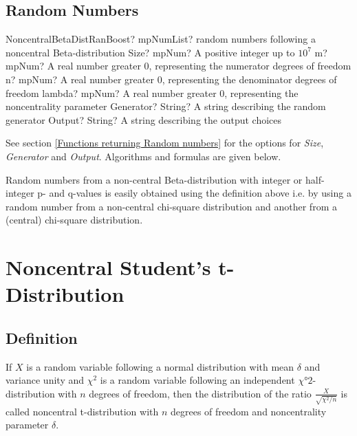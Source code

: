 \subsection{Random Numbers}

\begin{mpFunctionsExtract}
	\mpFunctionSixNotImplemented
	{NoncentralBetaDistRanBoost? mpNumList? random numbers following a noncentral Beta-distribution}
	{Size? mpNum? A positive integer up to $10^7$}
	{m? mpNum? A real number greater 0, representing the numerator  degrees of freedom}
	{n? mpNum? A real number greater 0, representing the denominator degrees of freedom}
	{lambda? mpNum? A real number greater 0, representing the noncentrality parameter}
	{Generator? String? A string describing the random generator}
	{Output? String? A string describing the output choices}
\end{mpFunctionsExtract}

\vspace{0.3cm}
See section \ref{Functions returning Random numbers} for the options for  {\itshape\sffamily Size},  {\itshape\sffamily Generator} and {\itshape\sffamily Output}. Algorithms and formulas are given below.

\vspace{0.3cm}
Random numbers from a non-central Beta-distribution with integer or half-integer p- and q-values is easily obtained using the definition above i.e. by using a random number from a non-central chi-square distribution and another from a (central) chi-square distribution.





\newpage
\section{Noncentral Student's t-Distribution}
\label{NoncentraltDistributionBoost}


\subsection{Definition}
\label{NoncentraltDistributionDefinitionBoost}


If $X$ is a random variable following a normal distribution with mean $\delta$ and variance unity and $\chi^2$ is a random variable following an independent $\chi°2$-distribution with $n$ degrees of freedom, 
then the distribution of the ratio $\frac{X}{\sqrt{\chi^2 / n}}$ is called noncentral t-distribution with $n$ degrees of freedom and noncentrality parameter $\delta$.



